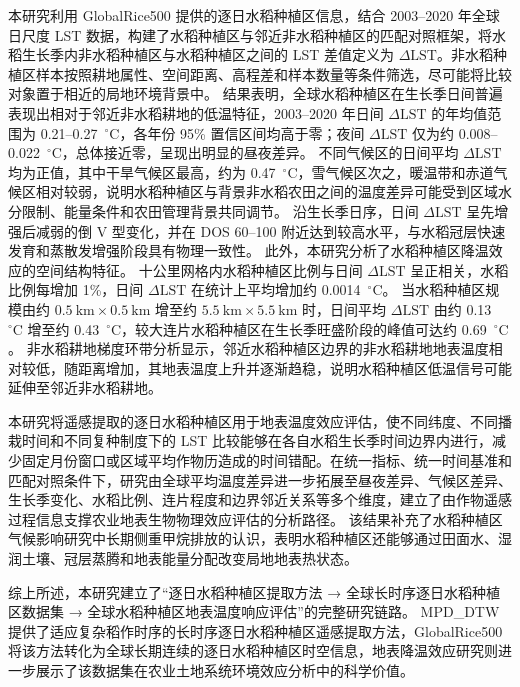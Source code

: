 本研究利用 GlobalRice500 提供的逐日水稻种植区信息，结合 2003--2020 年全球日尺度 LST 数据，构建了水稻种植区与邻近非水稻种植区的匹配对照框架，将水稻生长季内非水稻种植区与水稻种植区之间的 LST 差值定义为 $\Delta \mathrm{LST}$。非水稻种植区样本按照耕地属性、空间距离、高程差和样本数量等条件筛选，尽可能将比较对象置于相近的局地环境背景中。
结果表明，全球水稻种植区在生长季日间普遍表现出相对于邻近非水稻耕地的低温特征，2003--2020 年日间 $\Delta \mathrm{LST}$ 的年均值范围为 0.21--0.27~$^{\circ}\mathrm{C}$，各年份 95\% 置信区间均高于零；夜间 $\Delta \mathrm{LST}$ 仅为约 0.008--0.022~$^{\circ}\mathrm{C}$，总体接近零，呈现出明显的昼夜差异。
不同气候区的日间平均 $\Delta \mathrm{LST}$ 均为正值，其中干旱气候区最高，约为 0.47~$^{\circ}\mathrm{C}$，雪气候区次之，暖温带和赤道气候区相对较弱，说明水稻种植区与背景非水稻农田之间的温度差异可能受到区域水分限制、能量条件和农田管理背景共同调节。
沿生长季日序，日间 $\Delta \mathrm{LST}$ 呈先增强后减弱的倒 V 型变化，并在 DOS 60--100 附近达到较高水平，与水稻冠层快速发育和蒸散发增强阶段具有物理一致性。
此外，本研究分析了水稻种植区降温效应的空间结构特征。
十公里网格内水稻种植区比例与日间 $\Delta \mathrm{LST}$ 呈正相关，水稻比例每增加 1\%，日间 $\Delta \mathrm{LST}$ 在统计上平均增加约 0.0014~$^{\circ}\mathrm{C}$。
当水稻种植区规模由约 $0.5~\mathrm{km}\times0.5~\mathrm{km}$ 增至约 $5.5~\mathrm{km}\times5.5~\mathrm{km}$ 时，日间平均 $\Delta \mathrm{LST}$ 由约 0.13~$^{\circ}\mathrm{C}$ 增至约 0.43~$^{\circ}\mathrm{C}$，较大连片水稻种植区在生长季旺盛阶段的峰值可达约 0.69~$^{\circ}\mathrm{C}$。
非水稻耕地梯度环带分析显示，邻近水稻种植区边界的非水稻耕地地表温度相对较低，随距离增加，其地表温度上升并逐渐趋稳，说明水稻种植区低温信号可能延伸至邻近非水稻耕地。

本研究将遥感提取的逐日水稻种植区用于地表温度效应评估，使不同纬度、不同播栽时间和不同复种制度下的 LST 比较能够在各自水稻生长季时间边界内进行，减少固定月份窗口或区域平均作物历造成的时间错配。在统一指标、统一时间基准和匹配对照条件下，研究由全球平均温度差异进一步拓展至昼夜差异、气候区差异、生长季变化、水稻比例、连片程度和边界邻近关系等多个维度，建立了由作物遥感过程信息支撑农业地表生物物理效应评估的分析路径。
该结果补充了水稻种植区气候影响研究中长期侧重甲烷排放的认识，表明水稻种植区还能够通过田面水、湿润土壤、冠层蒸腾和地表能量分配改变局地地表热状态。

综上所述，本研究建立了“逐日水稻种植区提取方法 → 全球长时序逐日水稻种植区数据集 → 全球水稻种植区地表温度响应评估”的完整研究链路。
MPD\_DTW 提供了适应复杂稻作时序的长时序逐日水稻种植区遥感提取方法，GlobalRice500 将该方法转化为全球长期连续的逐日水稻种植区时空信息，地表降温效应研究则进一步展示了该数据集在农业土地系统环境效应分析中的科学价值。

